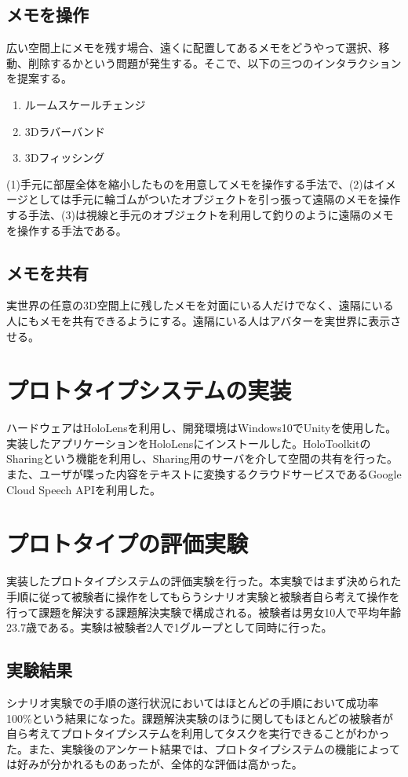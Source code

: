 \documentclass[twocolumn, a4paper]{UECIEresume}
\begin{document}
\subsection{メモを操作}
広い空間上にメモを残す場合、遠くに配置してあるメモをどうやって選択、移動、削除するかという問題が発生する。そこで、以下の三つのインタラクションを提案する。

\begin{enumerate}[(1)]
 \item ルームスケールチェンジ
 \item 3Dラバーバンド
 \item 3Dフィッシング
\end{enumerate}

(1)手元に部屋全体を縮小したものを用意してメモを操作する手法で、(2)はイメージとしては手元に輪ゴムがついたオブジェクトを引っ張って遠隔のメモを操作する手法、(3)は視線と手元のオブジェクトを利用して釣りのように遠隔のメモを操作する手法である。

\subsection{メモを共有}
実世界の任意の3D空間上に残したメモを対面にいる人だけでなく、遠隔にいる人にもメモを共有できるようにする。遠隔にいる人はアバターを実世界に表示させる。

\section{プロトタイプシステムの実装}
ハードウェアはHoloLensを利用し、開発環境はWindows10でUnity\cite{unity}を使用した。実装したアプリケーションをHoloLensにインストールした。HoloToolkit\cite{holotoolkit}のSharingという機能を利用し、Sharing用のサーバを介して空間の共有を行った。また、ユーザが喋った内容をテキストに変換するクラウドサービスであるGoogle Cloud Speech API\cite{speech}を利用した。

\section{プロトタイプの評価実験}
実装したプロトタイプシステムの評価実験を行った。本実験ではまず決められた手順に従って被験者に操作をしてもらうシナリオ実験と被験者自ら考えて操作を行って課題を解決する課題解決実験で構成される。被験者は男女10人で平均年齢23.7歳である。実験は被験者2人で1グループとして同時に行った。

\subsection{実験結果}
シナリオ実験での手順の遂行状況においてはほとんどの手順において成功率100\%という結果になった。課題解決実験のほうに関してもほとんどの被験者が自ら考えてプロトタイプシステムを利用してタスクを実行できることがわかった。また、実験後のアンケート結果では、プロトタイプシステムの機能によっては好みが分かれるものあったが、全体的な評価は高かった。
\end{document}
